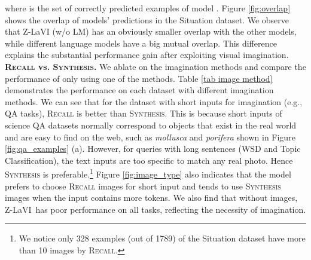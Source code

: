 \documentclass[11pt]{article}
\newcommand{\model}{Z-LaVI}
\begin{document}
where  is the set of correctly predicted examples of model . Figure \ref{fig:overlap} shows the overlap of models' predictions in the Situation dataset. We observe that Z-LaVI (w/o LM) has an obviously smaller overlap with the other models, while different language models have a big mutual overlap. This difference explains the substantial performance gain after exploiting visual imagination.
\medbreak
\noindent \textbf{\textsc{Recall} vs. \textsc{Synthesis}.} We ablate on the imagination methods and compare the performance of only using one of the methods. Table \ref{tab image method} demonstrates the performance on each dataset with different imagination methods. We can see that for the dataset with short inputs for imagination
(e.g., QA tasks), \textsc{Recall} is better than \textsc{Synthesis}. This is because 
short inputs of science QA datasets normally correspond to objects that exist in the real world and are easy to find on the web, such as \textit{mollusca} and \textit{porifera} shown in Figure \ref{fig:qa_examples} (a). However, for queries with long sentences (WSD and Topic Classification), the text inputs are too specific to match any real photo. Hence \textsc{Synthesis} is preferable.\footnote{We notice only 328 examples (out of 1789) of the Situation dataset have more than 10 images by \textsc{Recall}.} Figure \ref{fig:image_type} also indicates that the model prefers to choose \textsc{Recall} images for short input and tends to use \textsc{Synthesis} images when the input contains more tokens. We also find that without images, \model~has poor performance on all tasks, reflecting the necessity of imagination.
\end{document}
